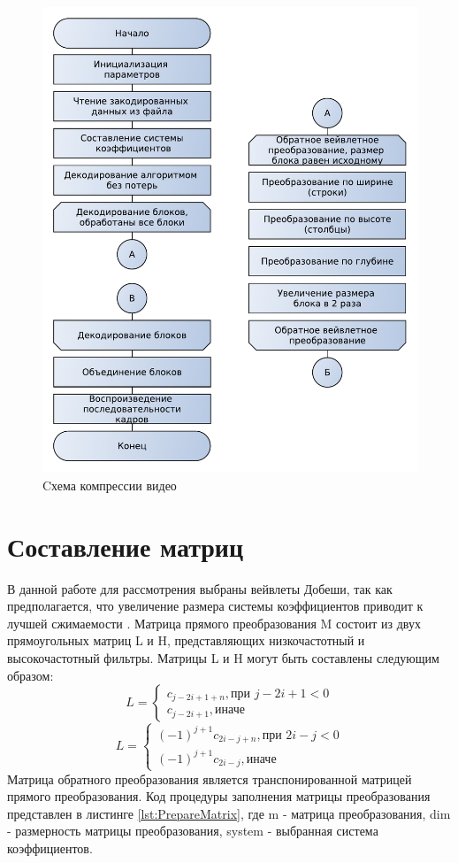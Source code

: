 \begin{figure}
  \centering
  \includegraphics[scale=0.75]{inc/graphics/alg2.pdf}
  \caption{Cхема компрессии видео}
  \label{fig:figalg2}
\end{figure}


\section{Составление матриц}
В данной работе для рассмотрения выбраны вейвлеты Добеши, так как предполагается, 
что увеличение размера системы коэффициентов приводит к лучшей сжимаемости \cite{Pup01}.
Матрица прямого преобразования M состоит из двух прямоугольных матриц L и H,  
представляющих низкочастотный и высокочастотный фильтры. Матрицы L и H могут быть составлены следующим образом:
\begin{equation}
L= \begin{cases}
 c_{j-2i+1+n}, \mbox{при $j-2i+1<0$} \\
 c_{j - 2i + 1}, \mbox{иначе}
\end{cases}
\label{F:F2}
\end{equation}
\begin{equation}
L= \begin{cases}
 (-1)^{j+1}c_{2i-j+n}, \mbox{при $2i-j<0$} \\
 (-1)^{j+1}c_{2i-j}, \mbox{иначе}
\end{cases}
\label{F:F2}
\end{equation}              
Матрица обратного преобразования является транспонированной матрицей прямого преобразования. Код процедуры заполнения 
матрицы преобразования представлен в листинге \ref{lst:PrepareMatrix}, где m - матрица преобразования, dim - размерность матрицы
преобразования, system - выбранная система коэффициентов.
        

